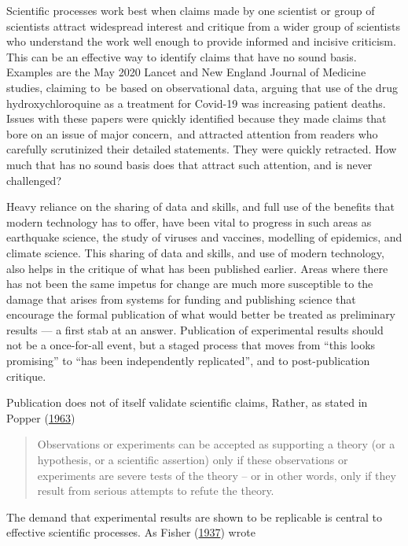 \documentclass[
  10ptls,
  b5paper]{book}
\begin{document}
Scientific processes work best when claims made by one scientist
or group of scientists attract widespread interest and critique
from a wider group of scientists who understand the work well
enough to provide informed and incisive criticism. This can be
an effective way to identify claims that have no sound basis.
Examples are the May 2020 Lancet and New England Journal of
Medicine studies, claiming to~be based on observational data,
arguing that use of the drug hydroxychloroquine as a treatment
for Covid-19 was increasing patient deaths.\\
Issues with these papers were quickly identified because they
made claims that bore on an issue of major concern,~and attracted
attention from readers who carefully scrutinized their detailed
statements. They were quickly retracted. How much that has no
sound basis does that attract such attention, and is never
challenged?

Heavy reliance on the sharing of data and skills, and full use of
the benefits that modern technology has to offer, have been vital
to progress in such areas as earthquake science, the study of
viruses and vaccines, modelling of epidemics, and climate science.
This sharing of data and skills, and use of modern technology, also
helps in the critique of what has been published earlier.
Areas where there has not been the same impetus for change are much
more susceptible to the damage that arises from systems for funding
and publishing science that encourage the formal publication of
what would better be treated as preliminary results --- a first
stab at an answer. Publication of experimental results should not
be a once-for-all event, but a staged process that moves from
``this looks promising'' to ``has been independently replicated'',
and to post-publication critique.

Publication does not of itself validate scientific claims,
Rather, as stated in Popper (\protect\hyperlink{ref-popper_1963}{1963})

\begin{quote}
Observations or experiments can be accepted as supporting a theory (or a hypothesis, or a scientific assertion) only if these observations or experiments are severe tests of the theory -- or in other words, only if they result from serious attempts to refute the theory.
\end{quote}

The demand that experimental results are shown to be replicable is
central to effective scientific processes. As Fisher (\protect\hyperlink{ref-fisher_1937}{1937}) wrote
\end{document}
